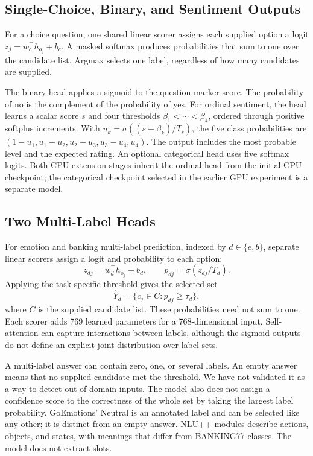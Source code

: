 \documentclass[conference]{IEEEtran}
\begin{document}
\subsection{Single-Choice, Binary, and Sentiment Outputs}
For a choice question, one shared linear scorer assigns each supplied option a logit $z_j=w_c^\top h_{o_j}+b_c$. A masked softmax produces probabilities that sum to one over the candidate list. Argmax selects one label, regardless of how many candidates are supplied.

The binary head applies a sigmoid to the question-marker score. The probability of no is the complement of the probability of yes. For ordinal sentiment, the head learns a scalar score $s$ and four thresholds $\beta_1<\cdots<\beta_4$, ordered through positive softplus increments. With $u_k=\sigma((s-\beta_k)/T_s)$, the five class probabilities are $(1-u_1,u_1-u_2,u_2-u_3,u_3-u_4,u_4)$. The output includes the most probable level and the expected rating. An optional categorical head uses five softmax logits. Both CPU extension stages inherit the ordinal head from the initial CPU checkpoint; the categorical checkpoint selected in the earlier GPU experiment is a separate model.

\subsection{Two Multi-Label Heads}
For emotion and banking multi-label prediction, indexed by $d\in\{e,b\}$, separate linear scorers assign a logit and probability to each option:
\begin{equation}
z_{dj}=w_d^\top h_{o_j}+b_d,\qquad
p_{dj}=\sigma(z_{dj}/T_d).
\end{equation}
Applying the task-specific threshold gives the selected set
\begin{equation}
\widehat{Y}_d=\{c_j\in C:p_{dj}\geq\tau_d\},
\end{equation}
where $C$ is the supplied candidate list. These probabilities need not sum to one. Each scorer adds 769 learned parameters for a 768-dimensional input. Self-attention can capture interactions between labels, although the sigmoid outputs do not define an explicit joint distribution over label sets.

A multi-label answer can contain zero, one, or several labels. An empty answer means that no supplied candidate met the threshold. We have not validated it as a way to detect out-of-domain inputs. The model also does not assign a confidence score to the correctness of the whole set by taking the largest label probability. GoEmotions' Neutral is an annotated label and can be selected like any other; it is distinct from an empty answer. NLU++ modules describe actions, objects, and states, with meanings that differ from BANKING77 classes. The model does not extract slots.
\end{document}
